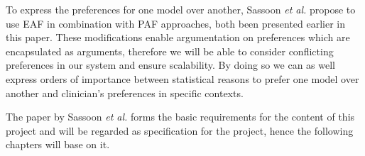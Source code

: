 To express the preferences for one model over another, Sassoon \textit{et al.} \cite{sassoon2016} propose to use \gls{EAF} \cite{Modgil2009} in combination with \gls{PAF} \cite{amgoud,amgoud2000} approaches, both been presented earlier in this paper. These modifications enable argumentation on preferences which are encapsulated as arguments, therefore we will be able to consider conflicting preferences in our system and ensure scalability. By doing so we can as well express orders of importance between statistical reasons to prefer one model over another and clinician's preferences in specific contexts.


The paper by Sassoon \textit{et al.} forms the basic requirements for the content of this project and will be regarded as specification for the project, hence the following chapters will base on it.

